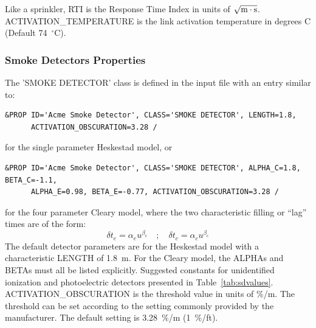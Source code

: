 \documentclass[11pt]{book}
\newcommand{\be}{\begin{equation}}
\newcommand{\ee}{\end{equation}}
\begin{document}
\normalsize
\noindent
Like a sprinkler, {\ct RTI} is the Response Time Index in units of
$\sqrt{\hbox{m}\cdot \hbox{s}}$.
{\ct ACTIVATION\_TEMPERATURE} is the link activation temperature in degrees C (Default 74~$^\circ$C).



\subsubsection{Smoke Detectors Properties}
\label{info:smoke_detector}
The {\ct 'SMOKE DETECTOR'} class is defined in the input file with an entry similar to:

\footnotesize
\begin{verbatim}
&PROP ID='Acme Smoke Detector', CLASS='SMOKE DETECTOR', LENGTH=1.8,
      ACTIVATION_OBSCURATION=3.28 /
\end{verbatim}

\normalsize
\noindent
for the single parameter Heskestad model, or

\footnotesize
\begin{verbatim}
&PROP ID='Acme Smoke Detector', CLASS='SMOKE DETECTOR', ALPHA_C=1.8, BETA_C=-1.1,
      ALPHA_E=0.98, BETA_E=-0.77, ACTIVATION_OBSCURATION=3.28 /
\end{verbatim}

\normalsize
\noindent
for the four parameter Cleary model, where the two characteristic filling or ``lag'' times are of the form:
\be \delta t_e = \alpha_e u^{\beta_e} \quad ; \quad \delta t_c = \alpha_c u^{\beta_c} \ee
The default detector parameters are for the Heskestad model with a characteristic {\ct LENGTH} of
1.8~m. For the Cleary model, the {\ct ALPHA}s and {\ct BETA}s must all be listed explicitly.
Suggested constants for unidentified ionization and photoelectric detectors
presented in Table~\ref{tab:sdvalues}.
{\ct ACTIVATION\_OBSCURATION} is the threshold value in units of \%/m.
The threshold can be set according to the setting commonly provided by the manufacturer.
The default setting is 3.28~\%/m (1~\%/ft).
\end{document}
